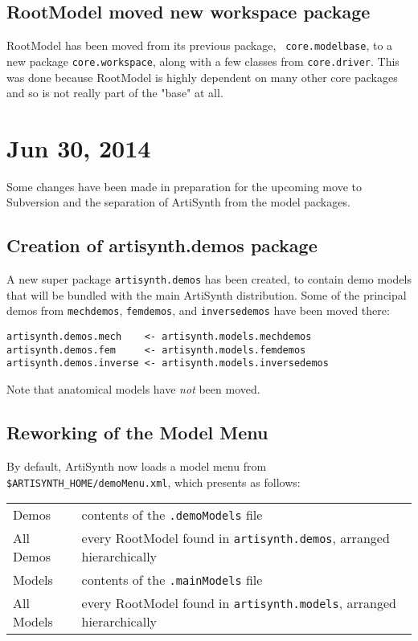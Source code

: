 \documentclass{article}
\begin{document}
\subsection*{RootModel moved new workspace package}

RootModel has been moved from its previous package, {\tt
core.modelbase}, to a new package {\tt core.workspace}, along with a
few classes from {\tt core.driver}. This was done because RootModel is
highly dependent on many other core packages and so is not really part
of the "base" at all.

\section*{Jun 30, 2014}

Some changes have been made in preparation for the upcoming move to
Subversion and the separation of ArtiSynth from the model packages.

\subsection*{Creation of artisynth.demos package}

A new super package {\tt artisynth.demos} has been created, to contain
demo models that will be bundled with the main ArtiSynth distribution.
Some of the principal demos from {\tt mechdemos}, {\tt femdemos}, 
and {\tt inversedemos} have been moved there:

\begin{lstlisting}[]
artisynth.demos.mech    <- artisynth.models.mechdemos
artisynth.demos.fem     <- artisynth.models.femdemos
artisynth.demos.inverse <- artisynth.models.inversedemos
\end{lstlisting}

Note that anatomical models have {\it not} been moved.

\subsection*{Reworking of the Model Menu}

By default, ArtiSynth now loads a model menu from {\tt
\$ARTISYNTH\_HOME/demoMenu.xml}, which presents as follows:

\begin{tabular}{ll}
{\sf Demos} & contents of the {\tt .demoModels} file\\
{\sf All Demos} & every RootModel found in {\tt artisynth.demos}, arranged
hierarchically\\
{\sf Models} & contents of the {\tt .mainModels} file\\
{\sf All Models} & every RootModel found in {\tt artisynth.models}, arranged
hierarchically
\end{tabular}
\end{document}
